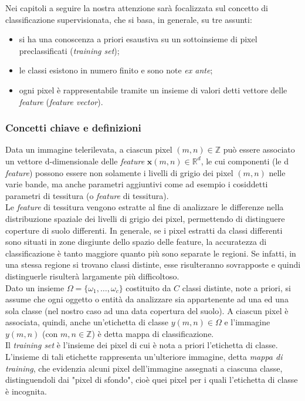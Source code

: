 Nei capitoli a seguire la nostra attenzione sarà focalizzata sul concetto di classificazione supervisionata, che si basa, in generale, su tre assunti:
\begin{itemize}
\item si ha una conoscenza a priori esaustiva su un sottoinsieme di pixel preclassificati (\emph{training set});
\item le classi esistono in numero finito e sono note \emph{ex ante};    
\item ogni pixel è rappresentabile tramite un insieme di valori detti vettore delle \emph{feature} (\emph{feature vector}).
\end{itemize}


\subsubsection*{Concetti chiave e definizioni}
Data un immagine telerilevata, a ciascun pixel $(m,n) \in \mathbb{Z}$ può essere associato un vettore d-dimensionale delle \emph{feature} $\textbf{x}(m,n)\in \mathbb{R}^d$, le cui componenti (le d \emph{feature}) possono essere non solamente i livelli di grigio dei pixel $(m,n)$ nelle varie bande, ma anche parametri aggiuntivi come ad esempio i cosiddetti parametri di tessitura (o \emph{feature} di tessitura).\\

Le \emph{feature} di tessitura vengono estratte al fine di analizzare le differenze nella distribuzione spaziale dei livelli di grigio dei pixel, permettendo di distinguere coperture di suolo differenti. In generale, se i pixel estratti da classi differenti sono situati in zone disgiunte dello spazio delle feature, la accuratezza di classificazione è tanto maggiore quanto più sono separate le regioni. Se infatti, in una stessa regione si trovano classi distinte, esse risulteranno sovrapposte e quindi distinguerle risulterà largamente più difficoltoso.
\\

Dato un insieme $\Omega =\lbrace\omega_1,\ldots, \omega_c\rbrace$ costituito da $C$ classi distinte, note a priori, si assume che ogni oggetto o entità da analizzare sia appartenente ad una ed una sola classe (nel nostro caso ad una data copertura del suolo). A ciascun pixel è associata, quindi, anche un'etichetta di classe $y(m,n) \in \Omega$ e l'immagine $y(m,n)$ (con $m,n\in \mathbb{Z}$) è detta mappa di classificazione.
\\

Il \emph{training set} è l'insieme dei pixel di cui è nota a priori l'etichetta di classe. L'insieme di tali etichette rappresenta un'ulteriore immagine, detta  \emph{mappa di training}, che evidenzia alcuni pixel dell'immagine assegnati a ciascuna classe, distinguendoli dai "pixel di sfondo", cioè quei pixel per i quali l'etichetta di classe è incognita.
\clearpage


